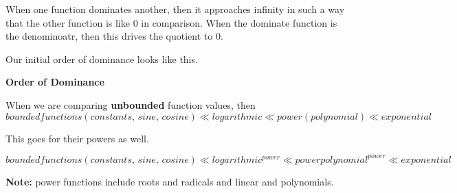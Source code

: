 \documentclass{ximera}
\begin{document}
When one function dominates another, then it approaches infinity in such a way that the other function is like $0$ in comparison. When the dominate function is the denominoatr, then this drives the quotient to $0$.


Our initial order of dominance looks like this. \\


\begin{summary} \textbf{\textcolor{purple!85!blue}{Order of Dominance}}


When we are comparing \textbf{unbounded} function values, then \\

\[   bounded functions (constants, \, sine, \, cosine)  \ll logarithmic \ll power (polynomial) \ll  exponential  \]



This goes for their powers as well. 


\[   bounded functions (constants, \, sine, \, cosine)  \ll logarithmic^{power} \ll power polynomial^{power} \ll  exponential  \]



\end{summary}

\textbf{Note:} power functions include roots and radicals and linear and polynomials.
\end{document}

